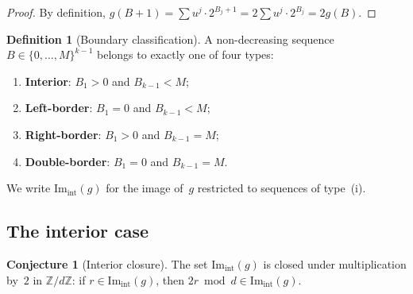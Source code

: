 \documentclass[12pt, a4paper]{amsart}
\theoremstyle{plain}
\theoremstyle{definition}
\newtheorem{definition}[theorem]{Definition}
\newtheorem{conjecture}[theorem]{Conjecture}
\theoremstyle{remark}
\newcommand{\Z}{\mathbb{Z}}
\begin{document}
\begin{proof}
  By definition,
  $g(B+1) = \sum u^j \cdot 2^{B_j+1}
  = 2 \sum u^j \cdot 2^{B_j} = 2g(B)$.
\end{proof}

\begin{definition}[Boundary classification]\label{def:boundary}
  A non-decreasing sequence $B \in \{0, \ldots, M\}^{k-1}$
  belongs to exactly one of four types:
  \begin{enumerate}[label=\textup{(\roman*)}]
    \item \textbf{Interior}: $B_1 > 0$ and $B_{k-1} < M$;
    \item \textbf{Left-border}: $B_1 = 0$ and $B_{k-1} < M$;
    \item \textbf{Right-border}: $B_1 > 0$ and $B_{k-1} = M$;
    \item \textbf{Double-border}: $B_1 = 0$ and $B_{k-1} = M$.
  \end{enumerate}
  We write $\mathrm{Im}_{\mathrm{int}}(g)$ for the image of~$g$
  restricted to sequences of type~\textup{(i)}.
\end{definition}

\subsection{The interior case}\label{ssec:interior}

\begin{conjecture}[Interior closure]\label{thm:interior-closure}
  The set $\mathrm{Im}_{\mathrm{int}}(g)$ is closed under
  multiplication by~$2$ in $\Z/d\Z$:
  if $r \in \mathrm{Im}_{\mathrm{int}}(g)$, then
  $2r \bmod d \in \mathrm{Im}_{\mathrm{int}}(g)$.
\end{conjecture}
\end{document}
